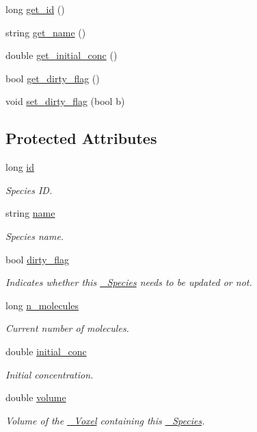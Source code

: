 \begin{DoxyCompactItemize}
long \hyperlink{classnw_1_1___species_a03f4b80da067d1bb6e2ab2d74e3f49d9}{get\+\_\+id} ()
\item 
string \hyperlink{classnw_1_1___species_ab52e303fd75637ca239b96a1efcd0bf4}{get\+\_\+name} ()
\item 
double \hyperlink{classnw_1_1___species_a8246da49ed5c2ce46365e5bd15025a1c}{get\+\_\+initial\+\_\+conc} ()
\item 
bool \hyperlink{classnw_1_1___species_a89fb2e72e485dd2f7fed07cfcfa7cdb0}{get\+\_\+dirty\+\_\+flag} ()
\item 
void \hyperlink{classnw_1_1___species_a9c52abce36663e6df5b51197282e0de3}{set\+\_\+dirty\+\_\+flag} (bool b)
\end{DoxyCompactItemize}
\subsection*{Protected Attributes}
\begin{DoxyCompactItemize}
\item 
long \hyperlink{classnw_1_1___species_ac42dfe1c656c17178a9649093519ebb7}{id}
\begin{DoxyCompactList}\small\item\em Species I\+D. \end{DoxyCompactList}\item 
string \hyperlink{classnw_1_1___species_a7b8ede09e28941beb48cf27f1247e2f9}{name}
\begin{DoxyCompactList}\small\item\em Species name. \end{DoxyCompactList}\item 
bool \hyperlink{classnw_1_1___species_a79157bae3920ce7bba35e3f75b2aad6f}{dirty\+\_\+flag}
\begin{DoxyCompactList}\small\item\em Indicates whether this \hyperlink{classnw_1_1___species}{\+\_\+\+Species} needs to be updated or not. \end{DoxyCompactList}\item 
long \hyperlink{classnw_1_1___species_af6ae0232b4f994b464a2f69cb022b33f}{n\+\_\+molecules}
\begin{DoxyCompactList}\small\item\em Current number of molecules. \end{DoxyCompactList}\item 
double \hyperlink{classnw_1_1___species_ac66cdd3bdd5be88791e00d063b4e92a2}{initial\+\_\+conc}
\begin{DoxyCompactList}\small\item\em Initial concentration. \end{DoxyCompactList}\item 
double \hyperlink{classnw_1_1___species_a80896a55f086f468396e76ae8f1e8285}{volume}
\begin{DoxyCompactList}\small\item\em Volume of the \hyperlink{classnw_1_1___voxel}{\+\_\+\+Voxel} containing this \hyperlink{classnw_1_1___species}{\+\_\+\+Species}. \end{DoxyCompactList}\end{DoxyCompactItemize}


